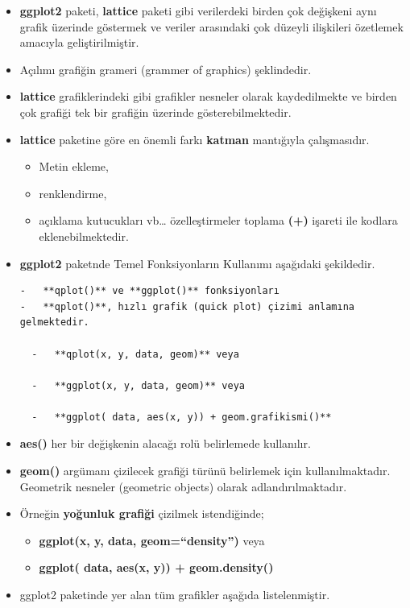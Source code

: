 \documentclass[
  oneside]{book}
\providecommand{\tightlist}{%
  \setlength{\itemsep}{0pt}\setlength{\parskip}{0pt}}
\begin{document}
\begin{itemize}
\item
  \textbf{ggplot2} paketi, \textbf{lattice} paketi gibi verilerdeki birden çok değişkeni aynı grafik üzerinde göstermek ve veriler arasındaki çok düzeyli ilişkileri özetlemek amacıyla geliştirilmiştir.
\item
  Açılımı grafiğin grameri (grammer of graphics) şeklindedir.
\item
  \textbf{lattice} grafiklerindeki gibi grafikler nesneler olarak kaydedilmekte ve birden çok grafiği tek bir grafiğin üzerinde gösterebilmektedir.
\item
  \textbf{lattice} paketine göre en önemli farkı \textbf{katman} mantığıyla çalışmasıdır.

  \begin{itemize}
  \tightlist
  \item
    Metin ekleme,
  \item
    renklendirme,
  \item
    açıklama kutucukları vb\ldots{} özelleştirmeler toplama \textbf{(+)} işareti ile kodlara eklenebilmektedir.
  \end{itemize}
\item
  \textbf{ggplot2} paketnde Temel Fonksiyonların Kullanımı aşağıdaki şekildedir.

\begin{verbatim}
-   **qplot()** ve **ggplot()** fonksiyonları
-   **qplot()**, hızlı grafik (quick plot) çizimi anlamına gelmektedir.

  -   **qplot(x, y, data, geom)** veya

  -   **ggplot(x, y, data, geom)** veya

  -   **ggplot( data, aes(x, y)) + geom.grafikismi()**
\end{verbatim}
\item
  \textbf{aes()} her bir değişkenin alacağı rolü belirlemede kullanılır.
\item
  \textbf{geom()} argümanı çizilecek grafiği türünü belirlemek için kullanılmaktadır. Geometrik nesneler (geometric objects) olarak adlandırılmaktadır.
\item
  Örneğin \textbf{yoğunluk grafiği} çizilmek istendiğinde;

  \begin{itemize}
  \item
    \textbf{ggplot(x, y, data, geom=``density'')} veya
  \item
    \textbf{ggplot( data, aes(x, y)) + geom.density()}
  \end{itemize}
\item
  ggplot2 paketinde yer alan tüm grafikler aşağıda listelenmiştir.
\end{itemize}
\end{document}
